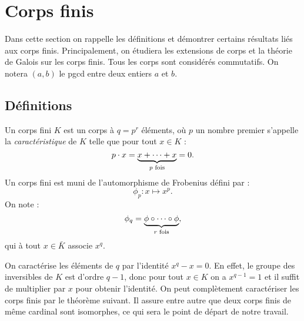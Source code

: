 \documentclass[a4paper]{article} %
\numberwithin{section}{part}
\numberwithin{equation}{section}
\begin{document}
\section{Corps finis}
Dans cette section on rappelle les définitions et démontrer certains 
résultats liés aux corps finis. Principalement, on étudiera les extensions 
de corps et la théorie de Galois sur les corps finis. Tous les corps sont
considérés commutatifs. On notera $(a,b)$ le pgcd entre deux entiers $a$ et $b$.

\subsection{Définitions}
Un corps fini $K$ est un corps à $q = p^r$ éléments, où $p$ un nombre premier
s'appelle la \emph{caractéristique} de $K$ telle que pour tout $x\in K$ :
\begin{equation}
p\cdot x = \underbrace{x+\dots+x}_{p\textup{ fois}} = 0.
\end{equation}
Un corps fini est muni de l'automorphisme de Frobenius défini par :
\begin{equation}
\phi_p : x \mapsto x^p.
\end{equation}
On note :
\begin{equation}
\phi_q = \underbrace{\phi\circ\cdots\circ\phi}_{r\textup{
fois}},
\end{equation}
qui à tout $x\in \bar{K}$ associe $x^q$.\par
On caractérise les éléments de $q$ par l'identité $x^q - x = 0$. En effet, le
groupe des inversibles de $K$ est d'ordre $q-1$, donc pour tout $x\in K$ on a
$x^{q-1} = 1$ et il suffit de multiplier par $x$ pour obtenir l'identité.
On peut complètement caractériser les corps finis par le théorème suivant. Il
assure entre autre que deux corps finis de même cardinal sont isomorphes, ce qui
sera le point de départ de notre travail.
\end{document}
